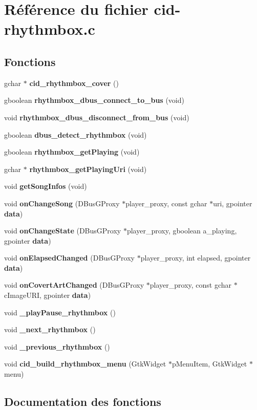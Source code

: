 \section{Référence du fichier cid-rhythmbox.c}
\label{cid-rhythmbox_8c}
\subsection*{Fonctions}
\begin{CompactItemize}
\item 
gchar $\ast$ {\bf cid\_\-rhythmbox\_\-cover} ()
\item 
gboolean {\bf rhythmbox\_\-dbus\_\-connect\_\-to\_\-bus} (void)
\item 
void {\bf rhythmbox\_\-dbus\_\-disconnect\_\-from\_\-bus} (void)
\item 
gboolean {\bf dbus\_\-detect\_\-rhythmbox} (void)
\item 
gboolean {\bf rhythmbox\_\-getPlaying} (void)
\item 
gchar $\ast$ {\bf rhythmbox\_\-getPlayingUri} (void)
\item 
void {\bf getSongInfos} (void)
\item 
void {\bf onChangeSong} (DBusGProxy $\ast$player\_\-proxy, const gchar $\ast$uri, gpointer {\bf data})
\item 
void {\bf onChangeState} (DBusGProxy $\ast$player\_\-proxy, gboolean a\_\-playing, gpointer {\bf data})
\item 
void {\bf onElapsedChanged} (DBusGProxy $\ast$player\_\-proxy, int elapsed, gpointer {\bf data})
\item 
void {\bf onCovertArtChanged} (DBusGProxy $\ast$player\_\-proxy, const gchar $\ast$cImageURI, gpointer {\bf data})
\item 
void {\bf \_\-playPause\_\-rhythmbox} ()
\item 
void {\bf \_\-next\_\-rhythmbox} ()
\item 
void {\bf \_\-previous\_\-rhythmbox} ()
\item 
void {\bf cid\_\-build\_\-rhythmbox\_\-menu} (GtkWidget $\ast$pMenuItem, GtkWidget $\ast$menu)
\end{CompactItemize}


\subsection{Documentation des fonctions}
